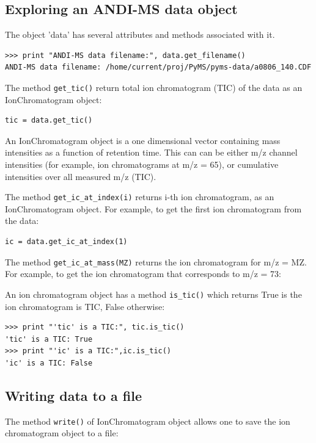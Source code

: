 \subsection{Exploring an ANDI-MS data object}

The object 'data' has several attributes and methods associated with it.

\begin{verbatim}
>>> print "ANDI-MS data filename:", data.get_filename()
ANDI-MS data filename: /home/current/proj/PyMS/pyms-data/a0806_140.CDF
\end{verbatim}

The method {\tt get\_tic()} return total ion chromatogram (TIC) of the data
as an IonChromatogram object:

\begin{verbatim}
tic = data.get_tic()
\end{verbatim}

\noindent
An IonChromatogram object is a one dimensional vector containing
mass intensities as a function of retention time. This can can be either
m/z channel intensities (for example, ion chromatograms at m/z = 65),
or cumulative intensities over all measured m/z (TIC).

The method {\tt get\_ic\_at\_index(i)} returns i-th ion chromatogram, as
an IonChromatogram object. For example, to get the first ion chromatogram
from the data:

\begin{verbatim}
ic = data.get_ic_at_index(1)
\end{verbatim}

The method {\tt get\_ic\_at\_mass(MZ)} returns the ion chromatogram for
m/z = MZ.  For example, to get the ion chromatogram that corresponds
to m/z = 73:

An ion chromatogram object has a method {\tt is\_tic()} which returns
True is the ion chromatogram is TIC, False otherwise:

\begin{verbatim}
>>> print "'tic' is a TIC:", tic.is_tic()
'tic' is a TIC: True
>>> print "'ic' is a TIC:",ic.is_tic()
'ic' is a TIC: False
\end{verbatim}

\subsection{Writing data to a file}

The method {\tt write()} of IonChromatogram object allows one to save
the ion chromatogram object to a file:

